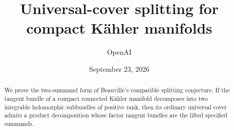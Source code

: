 \documentclass[11pt]{article}
\title{Universal-cover splitting for compact K\"ahler manifolds}
\author{OpenAI}
\date{September 23, 2026}
\theoremstyle{definition}
\theoremstyle{remark}
\numberwithin{equation}{section}
\begin{document}
\maketitle
\begin{abstract}
We prove the two-summand form of Beauville's compatible splitting conjecture.
If the tangent bundle of a compact connected K\"ahler manifold decomposes into
two integrable holomorphic subbundles of positive rank, then its ordinary
universal cover admits a product decomposition whose factor tangent bundles
are the lifted specified summands.
\end{abstract}
\tableofcontents
\clearpage







\appendix





\end{document}

